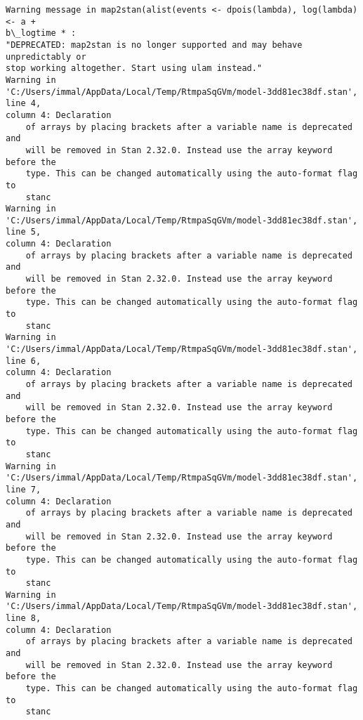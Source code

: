 \documentclass[11pt]{article}
\begin{document}
    \begin{Verbatim}[commandchars=\\\{\}]
Warning message in map2stan(alist(events <- dpois(lambda), log(lambda) <- a +
b\_logtime * :
"DEPRECATED: map2stan is no longer supported and may behave unpredictably or
stop working altogether. Start using ulam instead."
Warning in
'C:/Users/immal/AppData/Local/Temp/RtmpaSqGVm/model-3dd81ec38df.stan', line 4,
column 4: Declaration
    of arrays by placing brackets after a variable name is deprecated and
    will be removed in Stan 2.32.0. Instead use the array keyword before the
    type. This can be changed automatically using the auto-format flag to
    stanc
Warning in
'C:/Users/immal/AppData/Local/Temp/RtmpaSqGVm/model-3dd81ec38df.stan', line 5,
column 4: Declaration
    of arrays by placing brackets after a variable name is deprecated and
    will be removed in Stan 2.32.0. Instead use the array keyword before the
    type. This can be changed automatically using the auto-format flag to
    stanc
Warning in
'C:/Users/immal/AppData/Local/Temp/RtmpaSqGVm/model-3dd81ec38df.stan', line 6,
column 4: Declaration
    of arrays by placing brackets after a variable name is deprecated and
    will be removed in Stan 2.32.0. Instead use the array keyword before the
    type. This can be changed automatically using the auto-format flag to
    stanc
Warning in
'C:/Users/immal/AppData/Local/Temp/RtmpaSqGVm/model-3dd81ec38df.stan', line 7,
column 4: Declaration
    of arrays by placing brackets after a variable name is deprecated and
    will be removed in Stan 2.32.0. Instead use the array keyword before the
    type. This can be changed automatically using the auto-format flag to
    stanc
Warning in
'C:/Users/immal/AppData/Local/Temp/RtmpaSqGVm/model-3dd81ec38df.stan', line 8,
column 4: Declaration
    of arrays by placing brackets after a variable name is deprecated and
    will be removed in Stan 2.32.0. Instead use the array keyword before the
    type. This can be changed automatically using the auto-format flag to
    stanc


    \end{Verbatim}
\end{document}
